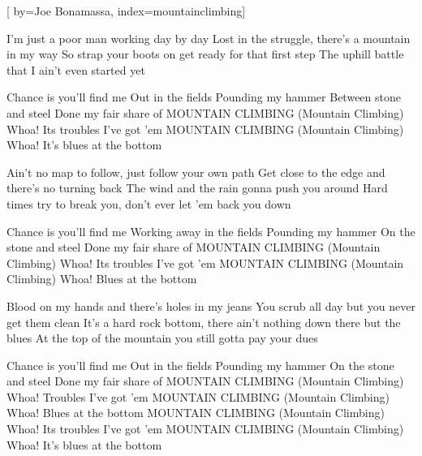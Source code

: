 

[%
    by={Joe Bonamassa},
    index={mountainclimbing}]


    \label{mountainclimbing}

    \beginverse
        I'm just a poor man working day by day
        Lost in the struggle, there's a mountain in my way
        So strap your boots on get ready for that first step
        The uphill battle that I ain't even started yet
    \endverse

    \beginchorus
        Chance is you'll find me
        Out in the fields
        Pounding my hammer
        Between stone and steel
        Done my fair share of
        MOUNTAIN CLIMBING (Mountain Climbing)
        Whoa! Its troubles I've got 'em
        MOUNTAIN CLIMBING (Mountain Climbing)
        Whoa! It's blues at the bottom
    \endchorus

    \beginverse
        Ain't no map to follow, just follow your own path
        Get close to the edge and there's no turning back
        The wind and the rain gonna push you around
        Hard times try to break you, don't ever let 'em back you down
    \endverse

    \beginchorus
        Chance is you'll find me
        Working away in the fields
        Pounding my hammer
        On the stone and steel
        Done my fair share of
        MOUNTAIN CLIMBING (Mountain Climbing)
        Whoa! Its troubles I've got 'em
        MOUNTAIN CLIMBING (Mountain Climbing)
        Whoa! Blues at the bottom
    \endchorus

    \beginverse
        Blood on my hands and there's holes in my jeans
        You scrub all day but you never get them clean
        It's a hard rock bottom, there ain't nothing down there but the blues
        At the top of the mountain you still gotta pay your dues
    \endverse

    \beginchorus
        Chance is you'll find me
        Out in the fields
        Pounding my hammer
        On the stone and steel
        Done my fair share of
        MOUNTAIN CLIMBING (Mountain Climbing)
        Whoa! Troubles I've got 'em
        MOUNTAIN CLIMBING (Mountain Climbing)
        Whoa! Blues at the bottom
        MOUNTAIN CLIMBING (Mountain Climbing)
        Whoa! Its troubles I've got 'em
        MOUNTAIN CLIMBING (Mountain Climbing)
        Whoa! It's blues at the bottom
    \endchorus
\endsong
